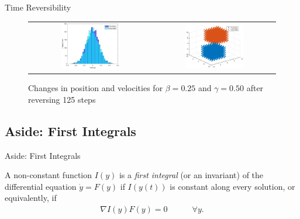\documentclass{beamer}
\begin{document}
\begin{frame}{Time Reversibility}
 {
	\begin{figure}
		\centering
 		\begin{tabular}{@{}cc@{}}
    			\includegraphics[width=0.5\textwidth]{time_reversible_b0,25g0,50_250_velocity_histogram.eps} &
    			\includegraphics[width=0.5\textwidth]{time_reversible_b0,25g0,50_250_position_overlay.eps} \\
		\end{tabular}
  		\caption{Changes in position and velocities for $\beta = 0.25$ and $\gamma = 0.50$ after reversing 125 steps}
		\label{fig:time_reversible_b0.25g0.50_250}
	\end{figure}
}
\end{frame}

\subsection{Aside: First Integrals}

\begin{frame}{Aside: First Integrals}
\begin{definition}
	A non-constant function $I(y)$ is a \textit{first integral} (or an invariant) of the differential equation $\dot{y} = F(y)$ if $I(y(t))$ is constant along every solution, or equivalently, if
\begin{align*}
	\nabla I(y)F(y) = 0    \quad \quad \quad  \forall y.
\end{align*}
\end{definition}
\end{frame}
\end{document}
